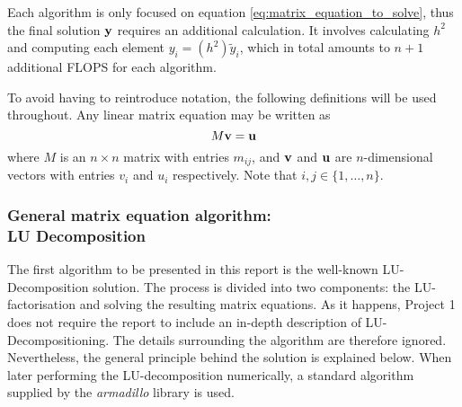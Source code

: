 \documentclass[reprint,english]{revtex4-1}
\begin{document}
Each algorithm is only focused on equation \eqref{eq:matrix_equation_to_solve}, thus the final solution \(\vb{y}\) requires an additional calculation. It involves calculating \(h^2\) and computing each element \(y_i=(h^2)\tilde{y}_i\), which in total amounts to \(n+1\) additional FLOPS for each algorithm.

To avoid having to reintroduce notation, the following definitions will be used throughout. Any linear matrix equation may be written as
\begin{equation}\label{eq:general_linear_matrix_equation}
M\vb{v}=\vb{u}
\end{equation}
where \(M\) is an \(n\times n\) matrix with entries \(m_{ij}\), and \(\vb{v}\) and \(\vb{u}\) are \(n\)-dimensional vectors with entries \(v_i\) and \(u_i\) respectively. Note that \(i,j\in\{1,\ldots,n\}\).
\subsubsection{General matrix equation algorithm:\\LU Decomposition}
The first algorithm to be presented in this report is the well-known LU-Decomposition solution. The process is divided into two components: the LU-factorisation and solving the resulting matrix equations. As it happens, Project 1 does not require the report to include an in-depth description of LU-Decompositioning. The details surrounding the algorithm are therefore ignored. Nevertheless, the general principle behind the solution is explained below. When later performing the LU-decomposition numerically, a standard algorithm supplied by the \emph{armadillo} library is used.
\end{document}

